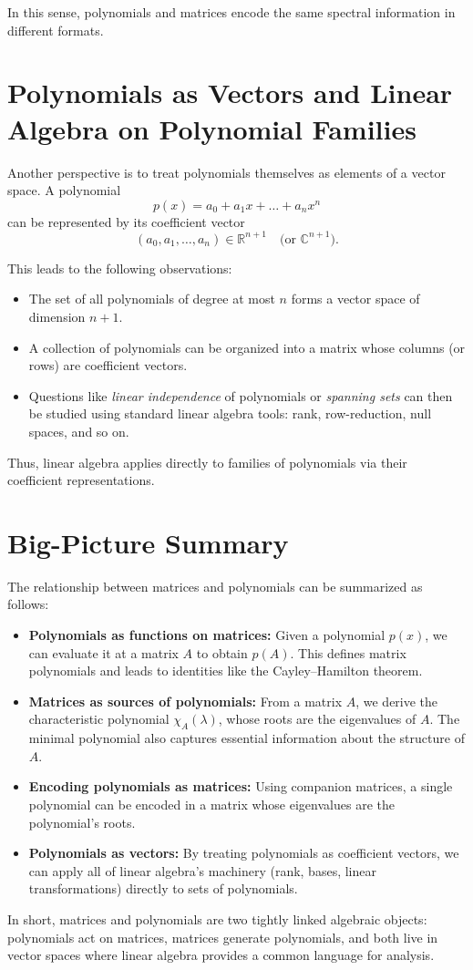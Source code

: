 \documentclass[11pt]{article}
\begin{document}
In this sense, polynomials and matrices encode the same spectral information in different formats.

\section{Polynomials as Vectors and Linear Algebra on Polynomial Families}

Another perspective is to treat polynomials themselves as elements of a vector space. A polynomial
\[
p(x) = a_0 + a_1 x + \dots + a_n x^n
\]
can be represented by its coefficient vector
\[
(a_0, a_1, \dots, a_n) \in \mathbb{R}^{n+1} \quad \text{(or } \mathbb{C}^{n+1}\text{)}.
\]

This leads to the following observations:
\begin{itemize}
  \item The set of all polynomials of degree at most \(n\) forms a vector space of dimension \(n+1\).
  \item A collection of polynomials can be organized into a matrix whose columns (or rows) are coefficient vectors.
  \item Questions like \emph{linear independence} of polynomials or \emph{spanning sets} can then be studied using standard linear algebra tools: rank, row-reduction, null spaces, and so on.
\end{itemize}

Thus, linear algebra applies directly to families of polynomials via their coefficient representations.

\section{Big-Picture Summary}

The relationship between matrices and polynomials can be summarized as follows:
\begin{itemize}
  \item \textbf{Polynomials as functions on matrices:} Given a polynomial \(p(x)\), we can evaluate it at a matrix \(A\) to obtain \(p(A)\). This defines matrix polynomials and leads to identities like the Cayley--Hamilton theorem.
  \item \textbf{Matrices as sources of polynomials:} From a matrix \(A\), we derive the characteristic polynomial \(\chi_A(\lambda)\), whose roots are the eigenvalues of \(A\). The minimal polynomial also captures essential information about the structure of \(A\).
  \item \textbf{Encoding polynomials as matrices:} Using companion matrices, a single polynomial can be encoded in a matrix whose eigenvalues are the polynomial's roots.
  \item \textbf{Polynomials as vectors:} By treating polynomials as coefficient vectors, we can apply all of linear algebra's machinery (rank, bases, linear transformations) directly to sets of polynomials.
\end{itemize}

In short, matrices and polynomials are two tightly linked algebraic objects: polynomials act on matrices, matrices generate polynomials, and both live in vector spaces where linear algebra provides a common language for analysis.
\end{document}
